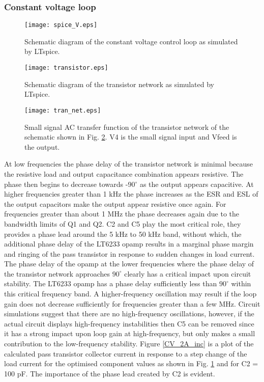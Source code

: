 \documentclass[a4paper,10pt, oneside]{article}
\begin{document}
\subsubsection*{Constant voltage loop}
\begin{figure}[H]
		\begin{centering}
	\texttt{[image: spice\_V.eps]}
	\caption{Schematic diagram of the constant voltage control loop as simulated by LTspice.}\label{spice_V}
		\end{centering}
\end{figure}
\begin{figure}[H]
		\begin{centering}
	\texttt{[image: transistor.eps]}
	\caption{Schematic diagram of the transistor network as simulated by LTspice.}\label{tran_network}
		\end{centering}
\end{figure}
\begin{figure}[H]
		\begin{centering}
	\texttt{[image: tran\_net.eps]}
	\caption{Small signal AC transfer function of the transistor network of the schematic shown in Fig. \ref{tran_network}. V4 is the small signal input and Vfeed is the output.}\label{tran_plot}
		\end{centering}
\end{figure}
At low frequencies the phase delay of the transistor network is minimal because the resistive load and output capacitance combination appears resistive. The phase then begins to decrease towards -90$^{\circ}$ as the output appears capacitive. At higher frequencies greater than 1 kHz the phase increases as the ESR and ESL of the output capacitors make the output appear resistive once again. For frequencies greater than about 1 MHz the phase decreases again due to the bandwidth limits of Q1 and Q2. C2 and C5 play the most critical role, they provides a phase lead around the 5 kHz to 50 kHz band, without which, the additional phase delay of the LT6233 opamp results in a marginal phase margin and ringing of the pass transistor in response to sudden changes in load current. The phase delay of the opamp at the lower frequencies where the phase delay of the transistor network approaches $90^{\circ}$ clearly has a critical impact upon circuit stability. The LT6233 opamp has a phase delay sufficiently less than $90^{\circ}$ within this critical frequency band.  A higher-frequency oscillation may result if the loop gain does not decrease sufficiently for frequencies greater than a few MHz. Circuit simulations suggest that there are no high-frequency oscillations, however, if the actual circuit displays high-frequency instabilities then C5 can be removed since it has a strong impact upon loop gain at high-frequency, but only makes a small contribution to the low-frequency stability. Figure \ref{CV_2A_inc} is a plot of the calculated pass transistor collector current in response to a step change of the load current for the optimised component values as shown in Fig. \ref{spice_V} and for C2 = 100 pF. The importance of the phase lead created by C2 is evident. 
\end{document}
